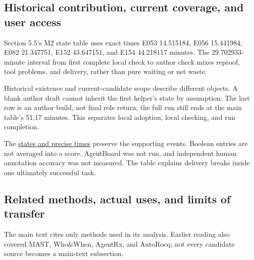 \subsection[Historical contribution, current coverage, and user access]{\texorpdfstring{\protect\hypertarget{u5}{}Historical contribution, current coverage, and user access}{Historical contribution, current coverage, and user access}}
Section 5.5's M2 state table uses exact times E053 14.515184, E056 15.441984, E082 21.347751, E152 43.647151, and E154 44.218117 minutes. The 29.702933-minute interval from first complete local check to author check mixes reproof, tool problems, and delivery, rather than pure waiting or net waste.

Historical existence and current-candidate scope describe different objects. A blank author draft cannot inherit the first helper's state by assumption. The last row is an author build, not final role return; the full run still ends at the main table's 51.17 minutes. This separates local adoption, local checking, and run completion.

The \href{research/analysis_20260915/final_research_supplement_20260915/evidence/progress_observations.json}{states and precise times} preserve the supporting events. Boolean entries are not averaged into a score. AgentBoard was not run, and independent human annotation accuracy was not measured. The table explains delivery breaks inside one ultimately successful task.

\subsection[Related methods, actual uses, and limits of transfer]{\texorpdfstring{\protect\hypertarget{u6}{}Related methods, actual uses, and limits of transfer}{Related methods, actual uses, and limits of transfer}}
The main text cites only methods used in its analysis. Earlier reading also covered MAST, Who\&When, AgentRx, and AutoRocq; not every candidate source becomes a main-text subsection.

